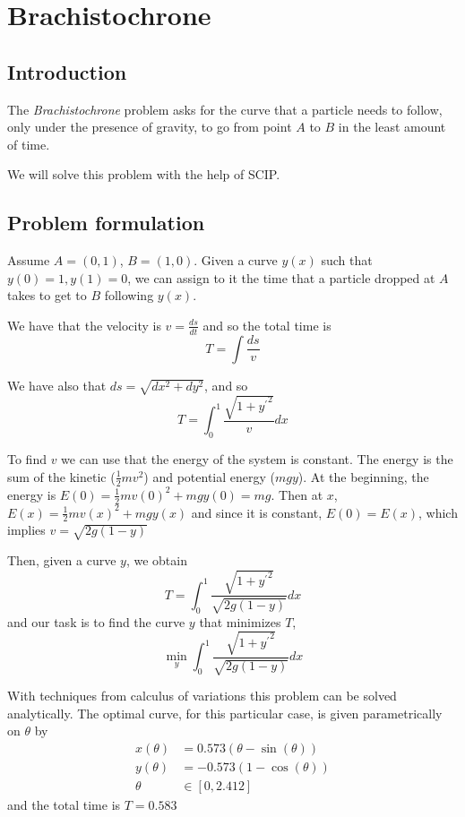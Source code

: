 \documentclass[12pt]{article}
\begin{document}
\section*{Brachistochrone}

\subsection*{Introduction}

The \emph{Brachistochrone} problem asks for the curve that a particle needs to
follow, only under the presence of gravity, to go from point $A$ to $B$ in the
least amount of time.

We will solve this problem with the help of SCIP.

\subsection*{Problem formulation}

Assume $A = (0,1)$, $B = (1,0)$. Given a curve $y(x)$ such that $y(0) = 1, y(1) = 0$, we can assign to it
the time that a particle dropped at $A$ takes to get to $B$ following $y(x)$.

We have that the velocity is $v = \tfrac{ds}{dt}$ and so the total time is
\[
    T = \int \frac{ds}{v}
\]

We have also that $ds = \sqrt{dx^2 + dy^2}$, and so
\[
    T = \int_0^1 \frac{\sqrt{1 + {y^{'}}^2}}{v} dx
\]

To find $v$ we can use that the energy of the system is constant.
The energy is the sum of the kinetic ($\tfrac{1}{2} m v^2$) and potential energy ($m g y$).
At the beginning, the energy is $E(0) = \tfrac{1}{2} m v(0)^2 + m g y(0) = m g$.
Then at $x$, $E(x) = \tfrac{1}{2} m v(x)^2 + m g y(x)$ and since it is constant, $E(0) = E(x)$, which implies
$v = \sqrt{2g(1 - y)}$

Then, given a curve $y$, we obtain
\[
    T = \int_0^1 \frac{\sqrt{1 + {y^{'}}^2}}{\sqrt{2g(1 - y)}} dx
\]
and our task is to find the curve $y$ that minimizes $T$,
\[
    \min_{y} \int_0^1 \frac{\sqrt{1 + {y^{'}}^2}}{\sqrt{2g(1 - y)}} dx
\]

With techniques from calculus of variations this problem can be solved analytically.
The optimal curve, for this particular case, is given parametrically on $\theta$ by
\begin{align*}
    x(\theta) &= 0.573 (\theta - \sin(\theta)) \\
    y(\theta) &= -0.573 (1 - \cos(\theta)) \\
       \theta &\in [0, 2.412]
\end{align*}
and the total time is $T = 0.583$
\end{document}

